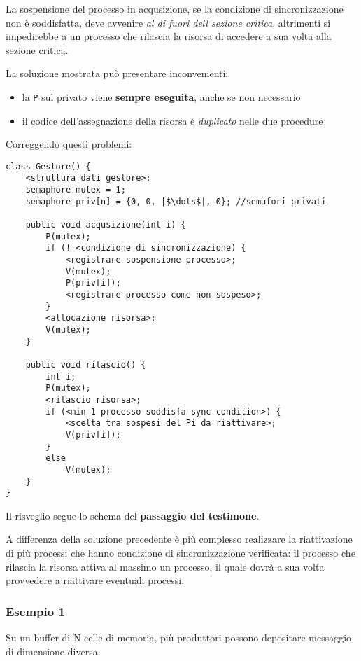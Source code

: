 La sospensione del processo in acqusizione, se la condizione di sincronizzazione non è soddisfatta, deve avvenire \textit{al di fuori dell sezione critica}, altrimenti si impedirebbe a un processo che rilascia la risorsa di accedere a sua volta alla sezione critica.

La soluzione mostrata può presentare inconvenienti:
\begin{itemize}
    \item la \texttt{P} sul privato viene \textbf{sempre eseguita}, anche se non necessario
    \item il codice dell'assegnazione della risorsa è \textit{duplicato} nelle due procedure
\end{itemize}

Correggendo questi problemi:

\begin{verbatim}
class Gestore() {
    <struttura dati gestore>;
    semaphore mutex = 1;
    semaphore priv[n] = {0, 0, |$\dots$|, 0}; //semafori privati

    public void acqusizione(int i) {
        P(mutex);
        if (! <condizione di sincronizzazione) {
            <registrare sospensione processo>;
            V(mutex);
            P(priv[i]);
            <registrare processo come non sospeso>;
        }
        <allocazione risorsa>;
        V(mutex);
    }

    public void rilascio() {
        int i;
        P(mutex);
        <rilascio risorsa>;
        if (<min 1 processo soddisfa sync condition>) {
            <scelta tra sospesi del Pi da riattivare>;
            V(priv[i]);
        }
        else
            V(mutex);
    }
}
\end{verbatim}

Il risveglio segue lo schema del \textbf{passaggio del testimone}.

A differenza della soluzione precedente è più complesso realizzare la riattivazione di più processi che hanno condizione di sincronizzazione verificata: il processo che rilascia la risorsa attiva al massimo un processo, il quale dovrà a sua volta provvedere a riattivare eventuali processi.

\subsubsection{Esempio 1}
Su un buffer di N celle di memoria, più produttori possono depositare messaggio di dimensione diversa.

